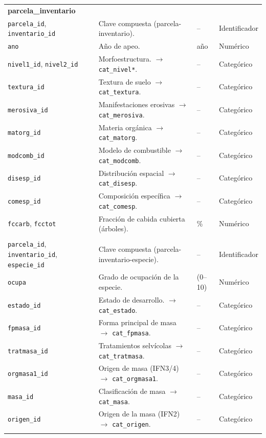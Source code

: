 \begin{longtable}{p{3.2cm} p{7.6cm} p{2.4cm} p{2.4cm}}
\multicolumn{4}{l}{\textbf{parcela\_inventario}} \\
\texttt{parcela\_id}, \texttt{inventario\_id} & Clave compuesta (parcela-inventario). & -- & Identificador \\
\texttt{ano} & Año de apeo. & año & Numérico \\
\texttt{nivel1\_id}, \texttt{nivel2\_id} & Morfoestructura. $\rightarrow$ \texttt{cat\_nivel*}. & -- & Categórico \\
\texttt{textura\_id} & Textura de suelo $\rightarrow$ \texttt{cat\_textura}. & -- & Categórico \\
\texttt{merosiva\_id} & Manifestaciones erosivas $\rightarrow$ \texttt{cat\_merosiva}. & -- & Categórico \\
\texttt{matorg\_id} & Materia orgánica $\rightarrow$ \texttt{cat\_matorg}. & -- & Categórico \\
\texttt{modcomb\_id} & Modelo de combustible $\rightarrow$ \texttt{cat\_modcomb}. & -- & Categórico \\
\texttt{disesp\_id} & Distribución espacial $\rightarrow$ \texttt{cat\_disesp}. & -- & Categórico \\
\texttt{comesp\_id} & Composición específica $\rightarrow$ \texttt{cat\_comesp}. & -- & Categórico \\
\texttt{fccarb}, \texttt{fcctot} & Fracción de cabida cubierta (árboles). & \% & Numérico \\
\addlinespace

\multicolumn{4}{l}{\textbf{parcela\_inventario\_especie}} \\
\texttt{parcela\_id}, \texttt{inventario\_id}, \texttt{especie\_id} & Clave compuesta (parcela-inventario-especie). & -- & Identificador \\
\texttt{ocupa} & Grado de ocupación de la especie. & (0--10) & Numérico \\
\texttt{estado\_id} & Estado de desarrollo. $\rightarrow$ \texttt{cat\_estado}. & -- & Categórico \\
\texttt{fpmasa\_id} & Forma principal de masa $\rightarrow$ \texttt{cat\_fpmasa}. & -- & Categórico \\
\texttt{tratmasa\_id} & Tratamientos selvícolas $\rightarrow$ \texttt{cat\_tratmasa}. & -- & Categórico \\
\texttt{orgmasa1\_id} & Origen de masa (IFN3/4)$\rightarrow$ \texttt{cat\_orgmasa1}. & -- & Categórico \\
\texttt{masa\_id} & Clasificación de masa $\rightarrow$ \texttt{cat\_masa}. & -- & Categórico \\
\texttt{origen\_id} & Origen de la masa (IFN2) $\rightarrow$ \texttt{cat\_origen}. & -- & Categórico \\
\addlinespace


\end{longtable}
